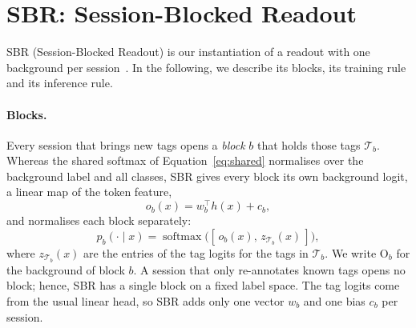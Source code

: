 \section{SBR: Session-Blocked Readout}
\label{sec:m-sbr}

SBR (Session-Blocked Readout) is our instantiation of a readout with one background per
session~\citep{liu2023ice,kim2022more}. In the following, we describe its blocks, its
training rule and its inference rule.

\paragraph{Blocks.} Every session that brings new tags opens a \emph{block} $b$ that holds
those tags $\mathcal{T}_b$. Whereas the shared softmax of Equation~\eqref{eq:shared}
normalises over the background label and all classes, SBR gives every block its own
background logit, a linear map of the token feature,
\begin{equation}
  o_b(x)=w_b^{\top}h(x)+c_b,
  \label{eq:olog}
\end{equation}
and normalises each block separately:
\begin{equation}
  p_b(\cdot\mid x)=\operatorname{softmax}\big([\,o_b(x),\,z_{\mathcal{T}_b}(x)\,]\big),
  \label{eq:block}
\end{equation}
where $z_{\mathcal{T}_b}(x)$ are the entries of the tag logits for the tags in
$\mathcal{T}_b$. We write $\mathrm{O}_b$ for the background of block $b$. A session that only
re-annotates known tags opens no block; hence, SBR has a single block on a fixed label
space. The tag logits come from the usual linear head, so SBR adds only one vector $w_b$ and
one bias $c_b$ per session.

